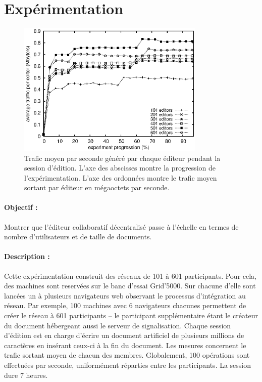 
\section{Expérimentation}
\label{editor:sec:experimentation}


\begin{figure}
  \begin{center}
    \includegraphics[width=0.8\textwidth]{img/editor/communication.eps}
    \caption{\label{editor:img:communication} Trafic moyen par seconde généré
      par chaque éditeur pendant la session d'édition. L'axe des abscisses
      montre la progression de l'expérimentation. L'axe des ordonnées montre le
      trafic moyen sortant par éditeur en mégaoctets par seconde.}
  \end{center}
\end{figure}

\paragraph{Objectif :} Montrer que l'éditeur collaboratif décentralisé \CRATE
passe à l'échelle en termes de nombre d'utilisateurs et de taille de
documents.

\paragraph{Description :} Cette expérimentation construit des réseaux de 101 à
601 participants. Pour cela, des machines sont reservées sur le banc d'essai
Grid'5000. Sur chacune d'elle sont lancées un à plusieurs navigateurs web
observant le processus d'intégration au réseau. Par exemple, 100 machines avec 6
navigateurs chacunes permettent de créer le réseau à 601 participants -- le
participant supplémentaire étant le créateur du document hébergeant aussi le
serveur de signalisation.  Chaque session d'édition est en charge d'écrire un
document artificiel de plusieurs millions de caractères en insérant ceux-ci à la
fin du document. Les mesures concernent le trafic sortant moyen de chacun des
membres. Globalement, 100 opérations sont effectuées par seconde, uniformément
réparties entre les participants. La session dure 7 heures.

